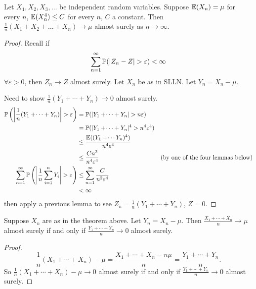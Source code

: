 \documentclass[10pt, a4paper]{article}
\begin{document}
\begin{theorem}[SLLN]
    Let $X_1, X_2, X_3, \dotsc$ be independent random variables.
    Suppose $\E(X_n) = \mu$ for every $n$,
    $\E(X_n ^ 4) \leq C$ for every $n$,
    $C$ a constant.
    Then $\frac{1}{n}(X_1 + X_2 + \dotsc + X_n) \to \mu$ almost surely as $n \to \infty$.

    \begin{proof}
        Recall if
        \[
        \sum_{n = 1}^{\infty}\P(|Z_n - Z| > \varepsilon) < \infty
        \]
        $\forall \varepsilon > 0$,
        then $Z_n \to Z$ almost surely.
        Let $X_n$ be as in SLLN.
        Let $Y_n = X_n - \mu$.

        Need to show $\frac{1}{n}(Y_1 + \dotsi + Y_n) \to 0$ almost surely.
        \begin{align*}
            \P\left(\left|\frac{1}{n}(Y_1 + \dotsi + Y_n)\right| > \varepsilon\right) &= \P(|Y_1 + \dotsi + Y_n| > n\varepsilon) \\
            &= \P(|Y_1 + \dotsi + Y_n| ^ 4 > n ^ 4\varepsilon ^ 4) \\
            &\leq \frac{\E((Y_1 + \dotsi Y_n) ^ 4)}{n ^ 4\varepsilon ^ 4} \\
            &\leq \frac{Cn ^ 2}{n ^ 4\varepsilon ^ 4} &\text{(by one of the four lemmas below)} \\
            \sum_{n = 1}^{\infty}\P\left(\left|\frac{1}{n}\sum_{i = 1}^{n}Y_i\right| > \varepsilon\right) &\leq \sum_{n = 1}^{\infty}\frac{C}{n ^ 2\varepsilon ^ 4} \\
            &< \infty
        \end{align*}
        then apply a previous lemma to see $Z_n = \frac{1}{n}(Y_1 + \dotsi + Y_n)$,
        $Z = 0$.
    \end{proof}
\end{theorem}

\begin{lemma}
    Suppose $X_n$ are as in the theorem above.
    Let $Y_n = X_n - \mu$.
    Then $\frac{X_1 + \dotsi + X_n}{n} \to \mu$ almost surely if and only if $\frac{Y_1 + \dotsi + Y_n}{n} \to 0$ almost surely.

    \begin{proof}
        \[
        \frac{1}{n}(X_1 + \dotsi + X_n) - \mu = \frac{X_1 + \dotsi + X_n - n\mu}{n} = \frac{Y_1 + \dotsi + Y_n}{n}.
        \]
        So $\frac{1}{n}(X_1 + \dotsi + X_n) - \mu \to 0$ almost surely if and only if $\frac{Y_1 + \dotsi + Y_n}{n} \to 0$ almost surely.
    \end{proof}
\end{lemma}
\end{document}
